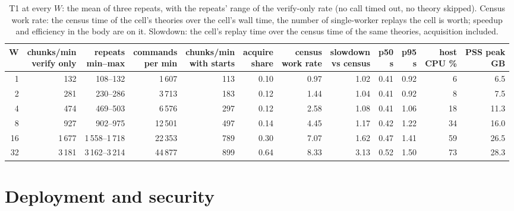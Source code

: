 \documentclass[11pt]{article}
\begin{document}
\begin{table}[!htb]
\centering\small
\setlength{\tabcolsep}{3.5pt}
\begin{tabular}{@{}r rr rr rr r rr rr@{}}
\toprule
W & \shortstack{chunks/min\\verify only} & \shortstack{repeats\\min--max} & \shortstack{commands\\per min} & \shortstack{chunks/min\\with starts} & \shortstack{acquire\\share} & \shortstack{census\\work rate} & \shortstack{slowdown\\vs census} & \shortstack{p50\\s} & \shortstack{p95\\s} & \shortstack{host\\CPU \%} & \shortstack{PSS peak\\GB} \\
\midrule
1  & 132   & 108--132 & 1\,607  & 113 & 0.10 & 0.97 & 1.02 & 0.41 & 0.92 & 6  & 6.5 \\
2  & 281   & 230--286 & 3\,713  & 183 & 0.12 & 1.44 & 1.04 & 0.41 & 0.92 & 8  & 7.5 \\
4  & 474   & 469--503 & 6\,576  & 297 & 0.12 & 2.58 & 1.08 & 0.41 & 1.06 & 18 & 11.3 \\
8  & 927   & 902--975 & 12\,501 & 497 & 0.14 & 4.45 & 1.17 & 0.42 & 1.22 & 34 & 16.0 \\
16 & 1\,677 & 1\,558--1\,718 & 22\,353 & 789 & 0.30 & 7.07 & 1.62 & 0.47 & 1.41 & 59 & 26.5 \\
32 & 3\,181 & 3\,162--3\,214 & 44\,877 & 899 & 0.64 & 8.33 & 3.13 & 0.52 & 1.50 & 73 & 28.3 \\
\bottomrule
\end{tabular}
\caption{T1 at every $W$: the mean of three repeats, with the repeats'
  range of the verify-only rate (no call timed out, no theory skipped).
  Census work rate: the census time of the cell's theories over the
  cell's wall time, the number of single-worker replays the cell is
  worth; speedup and efficiency in the body are on it. Slowdown: the
  cell's replay time over the census time of the same theories,
  acquisition included.}
\label{tab:t1-series}
\end{table}

\section{Deployment and security}
\label{app:deploy}
\end{document}
